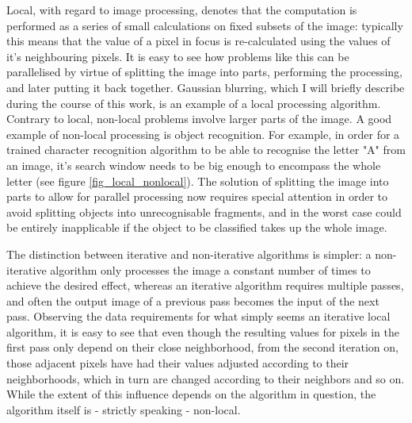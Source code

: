 \documentclass [12pt,a4paper]{report}
\begin{document}
Local, with regard to image processing, denotes that the computation is performed as a series of small calculations on fixed subsets of the image: typically this means that the value of a pixel in focus is re-calculated using the values of it's neighbouring pixels. It is easy to see how problems like this can be parallelised by virtue of splitting the image into parts, performing the processing, and later putting it back together. Gaussian blurring, which I will briefly describe during the course of this work, is an example of a local processing algorithm. Contrary to local, non-local problems involve larger parts of the image. A good example of non-local processing is object recognition. For example, in order for a trained character recognition algorithm to be able to recognise the letter "A" from an image, it's search window needs to be big enough to encompass the whole letter (see figure \ref{fig_local_nonlocal}). The solution of splitting the image into parts to allow for parallel processing now requires special attention in order to avoid splitting objects into unrecognisable fragments, and in the worst case could be entirely inapplicable if the object to be classified takes up the whole image. 

The distinction between iterative and non-iterative algorithms is simpler: a non-iterative algorithm only processes the image a constant number of times to achieve the desired effect, whereas an iterative algorithm requires multiple passes, and often the output image of a previous pass becomes the input of the next pass. Observing the data requirements for what simply seems an iterative local algorithm, it is easy to see that even though the resulting values for pixels in the first pass only depend on their close neighborhood, from the second iteration on, those adjacent pixels have had their values adjusted according to their neighborhoods, which in turn are changed according to their neighbors and so on. While the extent of this influence depends on the algorithm in question, the algorithm itself is - strictly speaking - non-local.
\end{document}

